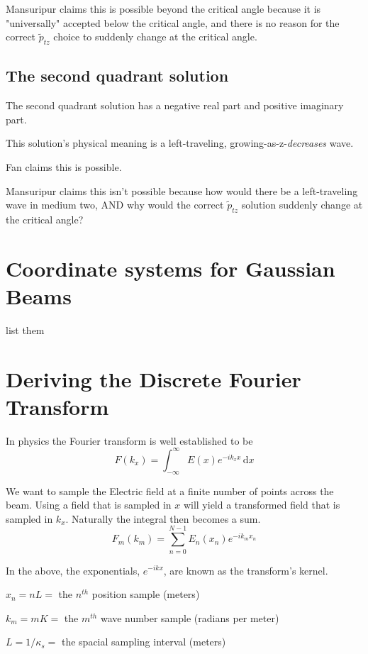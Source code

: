 \documentclass[10pt,a4paper]{article}
\begin{document}
Mansuripur claims this is possible beyond the critical angle because it is "universally" accepted below the critical angle, and there is no reason for the correct $\tilde{p}_{tz}$ choice to suddenly change at the critical angle.

\subsection{The second quadrant solution}
The second quadrant solution has a negative real part and positive imaginary part.

This solution's physical meaning is a left-traveling, growing-as-z-\emph{decreases} wave.

Fan claims this is possible.

Mansuripur claims this isn't possible because how would there be a left-traveling wave in medium two, AND why would the correct $\tilde{p}_{tz}$ solution suddenly change at the critical angle?


\section{Coordinate systems for Gaussian Beams}
list them

\section{Deriving the Discrete Fourier Transform}
In physics the Fourier transform is well established to be
\begin{equation}
F(k_x)=\int_{-\infty}^\infty E(x)e^{-ik_xx}\,\mathrm{d}x
\end{equation}

We want to sample the Electric field at a finite number of points across the beam. Using a field that is sampled in $x$ will yield a transformed field that is sampled in $k_x$. Naturally the integral then becomes a sum.
\begin{equation}
F_m(k_m)=\sum_{n=0}^{N-1} E_n(x_n)e^{-ik_mx_n}
\end{equation}

In the above, the exponentials, $e^{-ikx}$, are known as the transform's kernel.

$x_n = nL =$ the $n^{th}$ position sample (meters)

$k_m = mK =$ the $m^{th}$ wave number sample (radians per meter)

$L = 1/\kappa_s =$ the spacial sampling interval (meters)
\end{document}
